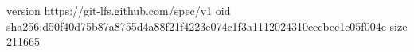 version https://git-lfs.github.com/spec/v1
oid sha256:d50f40d75b87a8755d4a88f21f4223e074c1f3a1112024310eecbcc1e05f004c
size 211665
